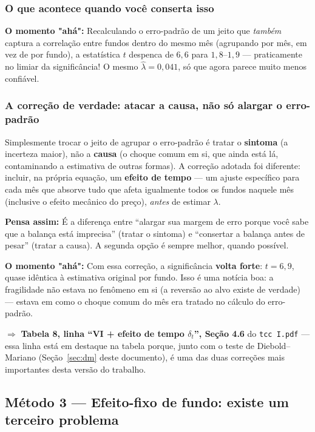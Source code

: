 \documentclass[11pt,a4paper]{article}
\newcommand{\analogia}[1]{\par\vspace{4pt}\noindent\textbf{\color{verde}Pensa assim:} #1\par\vspace{2pt}}
\newcommand{\aha}[1]{\par\vspace{4pt}\noindent\textbf{\color{vermelho}O momento "ahá":} #1\par\vspace{2pt}}
\begin{document}
\subsubsection*{O que acontece quando você conserta isso}

\aha{Recalculando o erro-padrão de um jeito que \emph{também} captura a correlação entre fundos
dentro do mesmo mês (agrupando por mês, em vez de por fundo), a estatística $t$ despenca de
$6{,}6$ para $1{,}8$--$1{,}9$ --- praticamente no limiar da significância! O mesmo $\widehat\lambda=0{,}041$,
só que agora parece muito menos confiável.}

\subsubsection*{A correção de verdade: atacar a causa, não só alargar o erro-padrão}

Simplesmente trocar o jeito de agrupar o erro-padrão é tratar o \textbf{sintoma} (a incerteza
maior), não a \textbf{causa} (o choque comum em si, que ainda está lá, contaminando a estimativa
de outras formas). A correção adotada foi diferente: incluir, na própria equação, um
\textbf{efeito de tempo} --- um ajuste específico para cada mês que absorve tudo que afeta
igualmente todos os fundos naquele mês (inclusive o efeito mecânico do preço), \emph{antes} de
estimar $\lambda$.

\analogia{É a diferença entre ``alargar sua margem de erro porque você sabe que a balança está
imprecisa'' (tratar o sintoma) e ``consertar a balança antes de pesar'' (tratar a causa). A
segunda opção é sempre melhor, quando possível.}

\aha{Com essa correção, a significância \textbf{volta forte}: $t=6{,}9$, quase idêntica à
estimativa original por fundo. Isso é uma notícia boa: a fragilidade não estava no fenômeno em
si (a reversão ao alvo existe de verdade) --- estava em como o choque comum do mês era tratado
no cálculo do erro-padrão.}

$\Rightarrow$ \textbf{Tabela 8, linha ``VI + efeito de tempo $\delta_t$'', Seção 4.6} do
\texttt{tcc I.pdf} --- essa linha está em destaque na tabela porque, junto com o teste de
Diebold--Mariano (Seção~\ref{sec:dm} deste documento), é uma das duas correções mais importantes
desta versão do trabalho.

\subsection{Método 3 --- Efeito-fixo de fundo: existe um terceiro problema}
\end{document}
